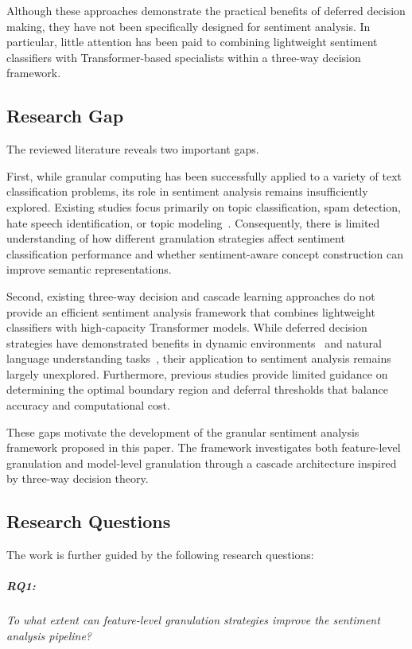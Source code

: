 \documentclass[a4paper,fleqn]{cas-dc}
\begin{document}
Although these approaches demonstrate the practical benefits of deferred decision making, they have not been specifically designed for sentiment analysis. In particular, little attention has been paid to combining lightweight sentiment classifiers with Transformer-based specialists within a three-way decision framework.

\subsection{Research Gap}

The reviewed literature reveals two important gaps.

First, while granular computing has been successfully applied to a variety of text classification problems, its role in sentiment analysis remains insufficiently explored. Existing studies focus primarily on topic classification, spam detection, hate speech identification, or topic modeling~\cite{Capillo2020mining, Possemato2013AutomaticTC, Behzadidoost2024GrC}. Consequently, there is limited understanding of how different granulation strategies affect sentiment classification performance and whether sentiment-aware concept construction can improve semantic representations.

Second, existing three-way decision and cascade learning approaches do not provide an efficient sentiment analysis framework that combines lightweight classifiers with high-capacity Transformer models. While deferred decision strategies have demonstrated benefits in dynamic environments~\cite{Yang2022temporal} and natural language understanding tasks~\cite{varshney2022model}, their application to sentiment analysis remains largely unexplored. Furthermore, previous studies provide limited guidance on determining the optimal boundary region and deferral thresholds that balance accuracy and computational cost.

These gaps motivate the development of the granular sentiment analysis framework proposed in this paper. The framework investigates both feature-level granulation and model-level granulation through a cascade architecture inspired by three-way decision theory.

\subsection{Research Questions}
The work is further guided by the following research questions:

\subparagraph{RQ1:} \emph{To what extent can feature-level granulation strategies improve the sentiment analysis pipeline?}
\end{document}
